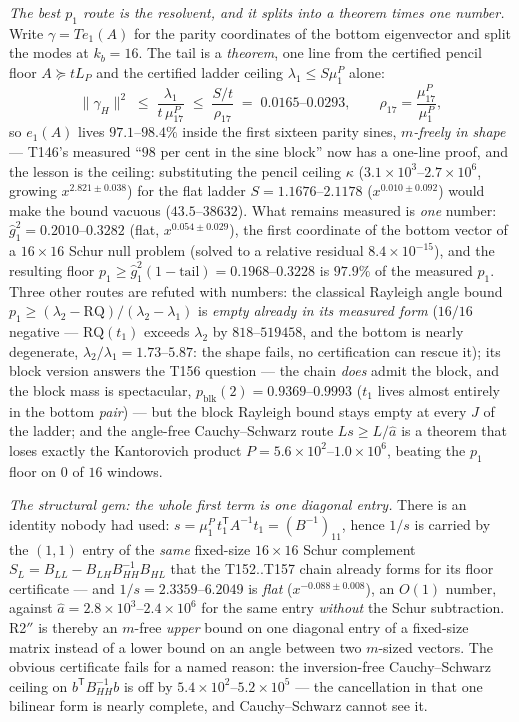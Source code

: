 \documentclass[11pt,a4paper]{article}
\begin{document}
\emph{The best $p_1$ route is the resolvent, and it splits into a theorem times one
number.} Write $\gamma=Te_1(A)$ for the parity coordinates of the bottom eigenvector and
split the modes at $k_b=16$. The tail is a \emph{theorem}, one line from the certified
pencil floor $A\succeq tL_P$ and the certified ladder ceiling
$\lambda_1\le S\mu^P_1$ alone:
\[
\|\gamma_H\|^2 \;\le\; \frac{\lambda_1}{t\,\mu^P_{17}} \;\le\;
\frac{S/t}{\rho_{17}} \;=\; 0.0165\text{--}0.0293 ,
\qquad \rho_{17}=\frac{\mu^P_{17}}{\mu^P_1},
\]
so $e_1(A)$ lives $97.1$--$98.4\%$ inside the first sixteen parity sines,
\emph{$m$-freely in shape} --- T146's measured ``$98$ per cent in the sine block'' now
has a one-line proof, and the lesson is the ceiling: substituting the pencil ceiling
$\kappa$ ($3.1\times10^{3}$--$2.7\times10^{6}$, growing $x^{2.821\pm0.038}$) for the flat
ladder $S=1.1676$--$2.1178$ ($x^{0.010\pm0.092}$) would make the bound vacuous
($43.5$--$38632$). What remains measured is \emph{one} number: $\hat
g_1^2=0.2010$--$0.3282$ (flat, $x^{0.054\pm0.029}$), the first coordinate of the bottom
vector of a $16\times16$ Schur null problem (solved to a relative residual
$8.4\times10^{-15}$), and the resulting floor $p_1\ge\hat
g_1^2(1-\mathrm{tail})=0.1968$--$0.3228$ is $97.9\%$ of the measured $p_1$. Three other
routes are refuted with numbers: the classical Rayleigh angle bound
$p_1\ge(\lambda_2-\mathrm{RQ})/(\lambda_2-\lambda_1)$ is \emph{empty already in its
measured form} ($16/16$ negative --- $\mathrm{RQ}(t_1)$ exceeds $\lambda_2$ by
$818$--$519458$, and the bottom is nearly degenerate, $\lambda_2/\lambda_1=1.73$--$5.87$:
the shape fails, no certification can rescue it); its block version answers the T156
question --- the chain \emph{does} admit the block, and the block mass is spectacular,
$p_{\mathrm{blk}}(2)=0.9369$--$0.9993$ ($t_1$ lives almost entirely in the bottom
\emph{pair}) --- but the block Rayleigh bound stays empty at every $J$ of the ladder; and
the angle-free Cauchy--Schwarz route $Ls\ge L/\hat a$ is a theorem that loses exactly the
Kantorovich product $P=5.6\times10^{2}$--$1.0\times10^{6}$, beating the $p_1$ floor on
$0$ of $16$ windows.

\emph{The structural gem: the whole first term is one diagonal entry.} There is an
identity nobody had used: $s=\mu^P_1\,t_1^{\mathsf T}A^{-1}t_1=(B^{-1})_{11}$, hence
$1/s$ is carried by the $(1,1)$ entry of the \emph{same} fixed-size $16\times16$ Schur
complement $S_L=B_{LL}-B_{LH}B_{HH}^{-1}B_{HL}$ that the T152..T157 chain already forms
for its floor certificate --- and $1/s=2.3359$--$6.2049$ is \emph{flat}
($x^{-0.088\pm0.008}$), an $O(1)$ number, against $\hat
a=2.8\times10^{3}$--$2.4\times10^{6}$ for the same entry \emph{without} the Schur
subtraction. R2$''$ is thereby an $m$-free \emph{upper} bound on one diagonal entry of a
fixed-size matrix instead of a lower bound on an angle between two $m$-sized vectors.
The obvious certificate fails for a named reason: the inversion-free Cauchy--Schwarz
ceiling on $b^{\mathsf T}B_{HH}^{-1}b$ is off by $5.4\times10^{2}$--$5.2\times10^{5}$ ---
the cancellation in that one bilinear form is nearly complete, and Cauchy--Schwarz
cannot see it.
\end{document}
